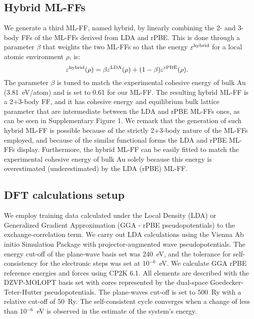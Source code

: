 \documentclass[%
aip,
 amsmath,amssymb,
 reprint,
]{revtex4-1}
\newcommand*\supt[1]{^{\textnormal{#1}}}
\begin{document}
\subsection*{Hybrid ML-FFs}
\label{subsubsec:hybrid}
We generate a third ML-FF, named hybrid, by linearly combining the 2- and 3-body FFs of the ML-FFs derived from LDA and rPBE.
%
This is done through a parameter $\beta$ that weights the two ML-FFs so that the energy $\varepsilon\supt{hybrid}$ for a local atomic environment $\rho$, is:
\begin{equation}
\varepsilon\supt{hybrid}(\rho) = \beta \varepsilon\supt{LDA}(\rho) + (1-\beta)\varepsilon\supt{rPBE}(\rho).
\end{equation}
%
The parameter $\beta$ is tuned to match the experimental cohesive energy of bulk Au (3.81~eV/atom) and is set to 0.61 for our ML-FF.
%
The resulting hybrid ML-FF is a 2+3-body FF, and it has cohesive energy and equilibrium bulk lattice parameter that are intermediate between the LDA and rPBE ML-FFs ones, as can be seen in Supplementary Figure 1.
%
We remark that the generation of such hybrid ML-FF is possible because of the strictly 2+3-body nature of the ML-FFs employed, and because of the similar functional forms the LDA and rPBE ML-FFs display.
%
Furthermore, the hybrid ML-FF can be easily fitted to match the experimental cohesive energy of bulk Au solely because this energy is overestimated (underestimated) by the LDA (rPBE) ML-FF.
%

\subsection*{DFT calculations setup}
\label{subsec:dft}
%
We employ training data calculated under the Local Density  (LDA) or Generalized Gradient Approximation (GGA - rPBE pseudopotentials) to the exchange-correlation term.
%
We carry out LDA\cite{Perdew1981} calculations using the Vienna Ab initio Simulation Package\cite{Kresse1996,Kresse1996a} with projector-augmented wave pseudopotentials.\cite{Blochl1994,Joubert1999} 
%
The energy cut-off of the plane-wave basis set was 240~eV, and the tolerance for self-consistency for the electronic steps was set at 10$^{-6}$~eV.
%
We calculate GGA rPBE \cite{Hammer1999} reference energies and forces using CP2K 6.1. \cite{Hutter2014}
%
All elements are described with the DZVP-MOLOPT basis set \cite{VandeVondele2007} with cores represented by the dual-space Goedecker-Teter-Hutter pseudopotentials.\cite{Krack2005}
%
The plane-waves cut-off is set to 500~Ry with a relative cut-off of 50~Ry.
%
The self-consistent cycle converges when a change of less than 10$^{-6}$~eV is observed in the estimate of the system's energy.
%
\end{document}
